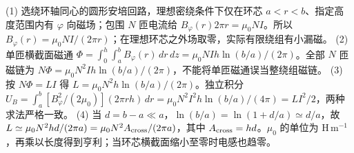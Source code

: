 (1) 选绕环轴同心的圆形安培回路，理想密绕条件下仅在环芯 \(a<r<b\)、指定高度范围内有 \(\varphi\) 向磁场；包围 \(N\) 匝电流给 \(B_\varphi(r)2\pi r=\mu_0NI\)。所以 \(B_\varphi(r)=\mu_0NI/(2\pi r)\)；在理想环芯之外场取零，实际有限绕组有小漏磁。
(2) 单匝横截面磁通 \(\Phi=\int_0^h\!\int_a^bB_\varphi(r)\,dr\,dz=\mu_0NIh\ln(b/a)/(2\pi)\)。全部 \(N\) 匝磁链为 \(N\Phi=\mu_0N^2Ih\ln(b/a)/(2\pi)\)，不能将单匝磁通误当整绕组磁链。
(3) 按 \(N\Phi=LI\) 得 \(L=\mu_0N^2h\ln(b/a)/(2\pi)\)。独立积分 \(U_B=\int_a^b[B_\varphi^2/(2\mu_0)](2\pi rh)\,dr=\mu_0N^2I^2h\ln(b/a)/(4\pi)=LI^2/2\)，两种求法严格一致。
(4) 当 \(d=b-a\ll a\)，\(\ln(b/a)=\ln(1+d/a)\simeq d/a\)，故 \(L\simeq\mu_0N^2hd/(2\pi a)=\mu_0N^2A_{\rm cross}/(2\pi a)\)，其中 \(A_{\rm cross}=hd\)。\(\mu_0\) 的单位为 \(\mathrm{H\,m^{-1}}\)，再乘以长度得到亨利；当环芯横截面缩小至零时电感也趋零。
